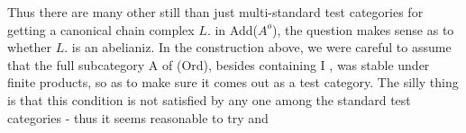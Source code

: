 Thus there are many other  still than just multi-standard
test categories for getting a canonical chain complex $L.$ in Add($A^o$),
  the question makes sense as to whether $L.$ is an abelianiz.
In the construction above, we were careful to assume that the full
subcategory  A of (Ord), besides containing I , was stable under
finite products, so as to make sure it comes out as a test category.
The silly thing is that this condition is not satisfied by any one among
the standard test categories - thus it seems reasonable to try and

